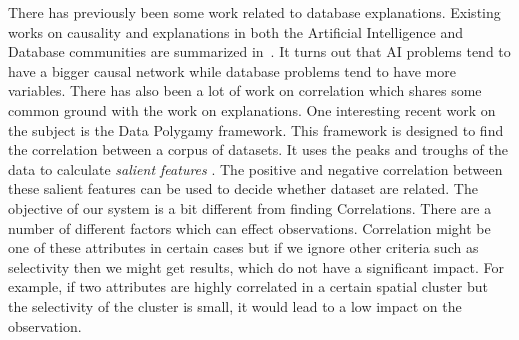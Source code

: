 There has previously been some work related to database explanations. 
Existing works on causality and explanations in both the Artificial Intelligence and Database communities are summarized in~\cite{meliou2014causality}. It turns out that AI problems tend to have a bigger causal network while database problems tend to have more variables.
There has also been a lot of work on correlation which shares some common ground with the work on explanations. One interesting recent work on the subject is the Data Polygamy framework\cite{chirigati2016data}. This framework is designed to find the correlation between a corpus of datasets. It uses the peaks and troughs of the data to calculate \textit{salient features} \cite{dunn1986applied}. The positive and negative correlation between these salient features can be used to decide whether dataset are related\cite{su2014supporting}. The objective of our system is a bit different from finding Correlations. There are a number of different factors which can effect observations. Correlation might be one of these attributes in certain cases but if we ignore other criteria such as selectivity then we might get results, which do not have a significant impact. For example, if two attributes are highly correlated in a certain spatial cluster but the selectivity of the cluster is small, it would lead to a low impact on the observation.





